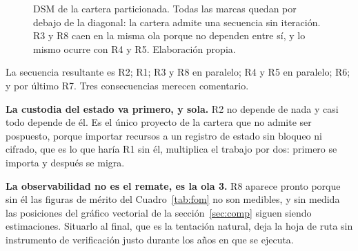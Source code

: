 \documentclass[11pt,letterpaper]{article}
\begin{document}
\begin{figure}[ht]
  \centering
  \caption{DSM de la cartera particionada. Todas las marcas quedan por debajo
  de la diagonal: la cartera admite una secuencia sin iteración. R3 y R8 caen
  en la misma ola porque no dependen entre sí, y lo mismo ocurre con R4 y R5.
  Elaboración propia.}
  \label{fig:dsmproyord}
\end{figure}

La secuencia resultante es R2; R1; R3 y R8 en paralelo; R4 y R5 en paralelo;
R6; y por último R7. Tres consecuencias merecen comentario.

\textbf{La custodia del estado va primero, y sola.} R2 no depende de nada y
casi todo depende de él. Es el único proyecto de la cartera que no admite ser
pospuesto, porque importar recursos a un registro de estado sin bloqueo ni
cifrado, que es lo que haría R1 sin él, multiplica el trabajo por dos: primero
se importa y después se migra.

\textbf{La observabilidad no es el remate, es la ola 3.} R8 aparece pronto
porque sin él las figuras de mérito del Cuadro~\ref{tab:fom} no son medibles,
y sin medida las posiciones del gráfico vectorial de la
sección~\ref{sec:comp} siguen siendo estimaciones. Situarlo al final, que es
la tentación natural, deja la hoja de ruta sin instrumento de verificación
justo durante los años en que se ejecuta.
\end{document}

